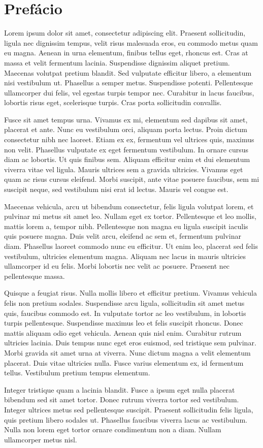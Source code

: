 \chapter{Prefácio}
\label{chap:prefacio}

Lorem ipsum dolor sit amet, consectetur adipiscing elit. Praesent sollicitudin, ligula nec dignissim tempus, velit risus malesuada eros, eu commodo metus quam eu magna. Aenean in urna elementum, finibus tellus eget, rhoncus est. Cras at massa et velit fermentum lacinia. Suspendisse dignissim aliquet pretium. Maecenas volutpat pretium blandit. Sed vulputate efficitur libero, a elementum nisi vestibulum ut. Phasellus a semper metus. Suspendisse potenti. Pellentesque ullamcorper dui felis, vel egestas turpis tempor nec. Curabitur in lacus faucibus, lobortis risus eget, scelerisque turpis. Cras porta sollicitudin convallis.

Fusce sit amet tempus urna. Vivamus ex mi, elementum sed dapibus sit amet, placerat et ante. Nunc eu vestibulum orci, aliquam porta lectus. Proin dictum consectetur nibh nec laoreet. Etiam ex ex, fermentum vel ultrices quis, maximus non velit. Phasellus vulputate ex eget fermentum vestibulum. In ornare cursus diam ac lobortis. Ut quis finibus sem. Aliquam efficitur enim et dui elementum viverra vitae vel ligula. Mauris ultrices sem a gravida ultricies. Vivamus eget quam ac risus cursus eleifend. Morbi suscipit, ante vitae posuere faucibus, sem mi suscipit neque, sed vestibulum nisi erat id lectus. Mauris vel congue est.

Maecenas vehicula, arcu ut bibendum consectetur, felis ligula volutpat lorem, et pulvinar mi metus sit amet leo. Nullam eget ex tortor. Pellentesque et leo mollis, mattis lorem a, tempor nibh. Pellentesque non magna eu ligula suscipit iaculis quis posuere magna. Duis velit arcu, eleifend ac sem et, fermentum pulvinar diam. Phasellus laoreet commodo nunc eu efficitur. Ut enim leo, placerat sed felis vestibulum, ultricies elementum magna. Aliquam nec lacus in mauris ultricies ullamcorper id eu felis. Morbi lobortis nec velit ac posuere. Praesent nec pellentesque massa.

Quisque a feugiat risus. Nulla mollis libero et efficitur pretium. Vivamus vehicula felis non pretium sodales. Suspendisse arcu ligula, sollicitudin sit amet metus quis, faucibus commodo est. In vulputate tortor ac leo vestibulum, in lobortis turpis pellentesque. Suspendisse maximus leo et felis suscipit rhoncus. Donec mattis aliquam odio eget vehicula. Aenean quis nisl enim. Curabitur rutrum ultricies lacinia. Duis tempus nunc eget eros euismod, sed tristique sem pulvinar. Morbi gravida sit amet urna at viverra. Nunc dictum magna a velit elementum placerat. Duis vitae ultricies nulla. Fusce varius elementum ex, id fermentum tellus. Vestibulum pretium tempus elementum.

Integer tristique quam a lacinia blandit. Fusce a ipsum eget nulla placerat bibendum sed sit amet tortor. Donec rutrum viverra tortor sed vestibulum. Integer ultrices metus sed pellentesque suscipit. Praesent sollicitudin felis ligula, quis pretium libero sodales ut. Phasellus faucibus viverra lacus ac vestibulum. Nulla non lorem eget tortor ornare condimentum non a diam. Nullam ullamcorper metus nisl. 
